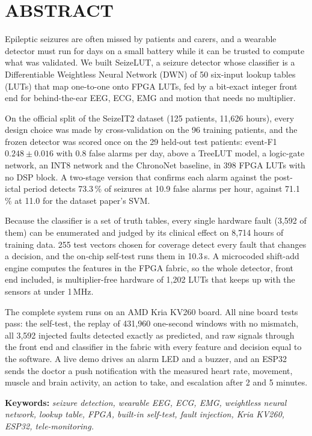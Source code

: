 \chapter*{ABSTRACT}
Epileptic seizures are often missed by patients and carers, and a wearable detector must run for days on a small
battery while it can be trusted to compute what was validated. We built SeizeLUT, a seizure detector whose classifier
is a Differentiable Weightless Neural Network (DWN) of 50 six-input lookup tables (LUTs) that map one-to-one onto
FPGA LUTs, fed by a bit-exact integer front end for behind-the-ear EEG, ECG, EMG and motion that needs no multiplier.

On the official split of the SeizeIT2 dataset (125 patients, 11,626 hours), every design choice was made by
cross-validation on the 96 training patients, and the frozen detector was scored once on the 29 held-out test
patients: event-F1 $0.248 \pm 0.016$ with 0.8 false alarms per day, above a TreeLUT model, a logic-gate network, an
INT8 network and the ChronoNet baseline, in 398 FPGA LUTs with no DSP block. A two-stage version that confirms each
alarm against the post-ictal period detects 73.3\,\% of seizures at 10.9 false alarms per hour, against 71.1\,\% at
11.0 for the dataset paper's SVM.

Because the classifier is a set of truth tables, every single hardware fault (3,592 of them) can be enumerated and
judged by its clinical effect on 8,714 hours of training data. 255 test vectors chosen for coverage detect every
fault that changes a decision, and the on-chip self-test runs them in 10.3\,\textmu s. A microcoded shift-add engine
computes the features in the FPGA fabric, so the whole detector, front end included, is multiplier-free hardware of
1,202 LUTs that keeps up with the sensors at under 1\,MHz.

The complete system runs on an AMD Kria KV260 board. All nine board tests pass: the self-test, the replay of 431,960
one-second windows with no mismatch, all 3,592 injected faults detected exactly as predicted, and raw signals through
the front end and classifier in the fabric with every feature and decision equal to the software. A live demo drives
an alarm LED and a buzzer, and an ESP32 sends the doctor a push notification with the measured heart rate, movement,
muscle and brain activity, an action to take, and escalation after 2 and 5 minutes.

\textbf{Keywords:} \textit{seizure detection, wearable EEG, ECG, EMG, weightless neural network, lookup table, FPGA, built-in self-test, fault injection, Kria KV260, ESP32, tele-monitoring.}
